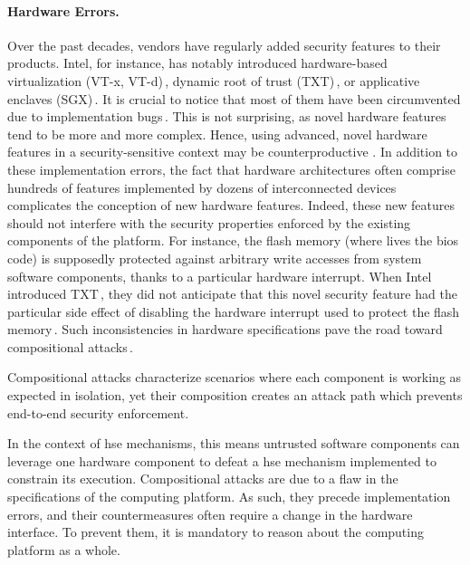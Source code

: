 \paragraph{Hardware Errors.}
%
Over the past decades, vendors have regularly added security features to their
products.
%
Intel, for instance, has notably introduced hardware-based virtualization (VT-x,
VT-d)\,\cite{intel2014manualvt}, dynamic root of trust
(TXT)\,\cite{intel2015txt}, or applicative enclaves
(SGX)\,\cite{intel2014manualsgx,costan2016sgxexplained}.
%
It is crucial to notice that most of them have been circumvented due to
implementation bugs\,\cite{wojtczuk2011txtbug,sang2010iommu}.
%
This is not surprising, as novel hardware features tend to be more and more
complex.
%
Hence, using advanced, novel hardware features in a security-sensitive context
may be counterproductive .
%
In addition to these implementation errors, the fact that hardware architectures
often comprise hundreds of features implemented by dozens of interconnected
devices complicates the conception of new hardware features.
%
Indeed, these new features should not interfere with the security properties
enforced by the existing components of the platform.
%
For instance, the flash memory (where lives the \ac{bios} code) is supposedly
protected against arbitrary write accesses from system software components,
thanks to a particular hardware interrupt.
%
When Intel introduced TXT\,\cite{intel2015txt}, they did not anticipate that
this novel security feature had the particular side effect of disabling the
hardware interrupt used to protect the flash memory\,\cite{kovah2015senter}.
%
Such inconsistencies in hardware specifications pave the road toward
compositional attacks\,\cite{wing2003compositionalattack}.

\begin{definition}
  Compositional attacks characterize scenarios where each component is working
  as expected in isolation, yet their composition creates an attack path which
  prevents end-to-end security enforcement.
\end{definition}

In the context of \ac{hse} mechanisms, this means untrusted software components
can leverage one hardware component to defeat a \ac{hse} mechanism implemented
to constrain its execution.
%
%
Compositional attacks are due to a flaw in the specifications of the computing
platform.
%
As such, they precede implementation errors, and their countermeasures often
require a change in the hardware interface.
%
To prevent them, it is mandatory to reason about the computing platform as a
whole.

